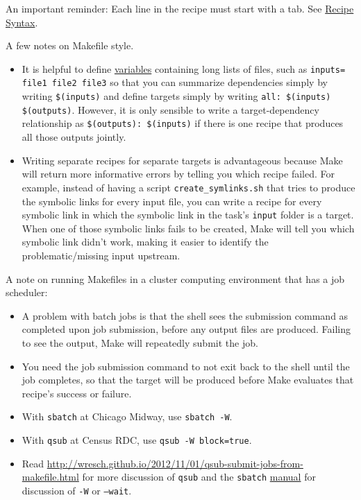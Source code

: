 An important reminder: Each line in the recipe must start with a tab.
See \href{https://www.gnu.org/software/make/manual/html_node/Recipe-Syntax.html}{Recipe Syntax}.

A few notes on Makefile style.
\begin{itemize}
\item It is helpful to define \href{https://www.gnu.org/software/make/manual/html_node/Variables-Simplify.html#Variables-Simplify}{variables} containing long lists of files, such as \texttt{inputs= file1 file2 file3}
so that you can summarize dependencies simply by writing \texttt{\$(inputs)}
and define targets simply by writing \texttt{all: \$(inputs) \$(outputs)}.
However, it is only sensible to write a target-dependency relationship as
\texttt{\$(outputs): \$(inputs)}
if there is one recipe that produces all those outputs jointly.
\item Writing separate recipes for separate targets is advantageous because Make will return more informative errors by telling you which recipe failed.
For example, instead of having a script \texttt{create\_symlinks.sh} that tries to produce the symbolic links for every input file,
you can write a recipe for every symbolic link in which the symbolic link in the task's \texttt{input} folder is a target.
When one of those symbolic links fails to be created, Make will tell you which symbolic link didn't work, making it easier to identify the problematic/missing input upstream.
\end{itemize}

A note on running Makefiles in a cluster computing environment that has a job scheduler:
\begin{itemize}
	\item A problem with batch jobs is that the shell sees the submission command as completed upon job submission, before any output files are produced.
	Failing to see the output, Make will repeatedly submit the job.
	\item You need the job submission command to not exit back to the shell until the job completes, so that the target will be produced before Make evaluates that recipe's success or failure.
	\item With \texttt{sbatch} at Chicago Midway, use \texttt{sbatch -W}.
	\item With \texttt{qsub} at Census RDC, use \texttt{qsub -W block=true}.
	\item Read \url{http://wresch.github.io/2012/11/01/qsub-submit-jobs-from-makefile.html} for more discussion of \texttt{qsub} and the \texttt{sbatch} \href{https://slurm.schedmd.com/sbatch.html}{manual} for discussion of \texttt{-W} or \texttt{--wait}. 
\end{itemize}

